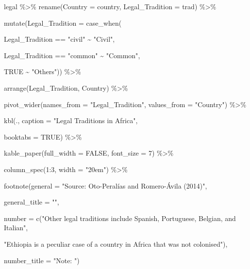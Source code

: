 \documentclass[a4paper,nobind]{templates/ociamthesis}
\newenvironment{Shaded}{\begin{snugshade}}{\end{snugshade}}
\newcommand{\AttributeTok}[1]{\textcolor[rgb]{0.77,0.63,0.00}{#1}}
\newcommand{\ConstantTok}[1]{\textcolor[rgb]{0.00,0.00,0.00}{#1}}
\newcommand{\DecValTok}[1]{\textcolor[rgb]{0.00,0.00,0.81}{#1}}
\newcommand{\FunctionTok}[1]{\textcolor[rgb]{0.00,0.00,0.00}{#1}}
\newcommand{\NormalTok}[1]{#1}
\newcommand{\SpecialCharTok}[1]{\textcolor[rgb]{0.00,0.00,0.00}{#1}}
\newcommand{\StringTok}[1]{\textcolor[rgb]{0.31,0.60,0.02}{#1}}
\renewenvironment{Shaded}
{
  \vspace{10pt}%
  \begin{snugshade}%
}{%
  \end{snugshade}%
  \vspace{8pt}%
}
\begin{document}
\begin{Shaded}
\begin{Highlighting}[]
\NormalTok{legal }\SpecialCharTok{\%\textgreater{}\%} \FunctionTok{rename}\NormalTok{(}\AttributeTok{Country =}\NormalTok{ country, }\AttributeTok{Legal\_Tradition =}\NormalTok{ trad) }\SpecialCharTok{\%\textgreater{}\%} 
  
  \FunctionTok{mutate}\NormalTok{(}\AttributeTok{Legal\_Tradition =} \FunctionTok{case\_when}\NormalTok{(}
    
\NormalTok{    Legal\_Tradition }\SpecialCharTok{==} \StringTok{"civil"} \SpecialCharTok{\textasciitilde{}} \StringTok{"Civil"}\NormalTok{,}
    
\NormalTok{    Legal\_Tradition }\SpecialCharTok{==} \StringTok{"common"} \SpecialCharTok{\textasciitilde{}} \StringTok{"Common"}\NormalTok{,}
    
    \ConstantTok{TRUE} \SpecialCharTok{\textasciitilde{}} \StringTok{"Others"}\NormalTok{)) }\SpecialCharTok{\%\textgreater{}\%} 
  
  \FunctionTok{arrange}\NormalTok{(Legal\_Tradition, Country) }\SpecialCharTok{\%\textgreater{}\%} 
  
  \FunctionTok{pivot\_wider}\NormalTok{(}\AttributeTok{names\_from =} \StringTok{"Legal\_Tradition"}\NormalTok{, }\AttributeTok{values\_from =} \StringTok{"Country"}\NormalTok{) }\SpecialCharTok{\%\textgreater{}\%} 
  
  \FunctionTok{kbl}\NormalTok{(., }\AttributeTok{caption =} \StringTok{"Legal Traditions in Africa"}\NormalTok{, }
      
      \AttributeTok{booktabs =} \ConstantTok{TRUE}\NormalTok{) }\SpecialCharTok{\%\textgreater{}\%} 
  
  \FunctionTok{kable\_paper}\NormalTok{(}\AttributeTok{full\_width =} \ConstantTok{FALSE}\NormalTok{, }\AttributeTok{font\_size =} \DecValTok{7}\NormalTok{) }\SpecialCharTok{\%\textgreater{}\%} 
  
  \FunctionTok{column\_spec}\NormalTok{(}\DecValTok{1}\SpecialCharTok{:}\DecValTok{3}\NormalTok{, }\AttributeTok{width =} \StringTok{"20em"}\NormalTok{) }\SpecialCharTok{\%\textgreater{}\%} 
  
  \FunctionTok{footnote}\NormalTok{(}\AttributeTok{general =} \StringTok{"Source: Oto{-}Peralías and Romero{-}Ávila (2014)"}\NormalTok{,}
           
           \AttributeTok{general\_title =} \StringTok{""}\NormalTok{,}
           
           \AttributeTok{number =} \FunctionTok{c}\NormalTok{(}\StringTok{"Other legal traditions include Spanish, Portuguese, Belgian, and Italian"}\NormalTok{, }
                      
                      \StringTok{"Ethiopia is a peculiar case of a country in Africa that was not colonised"}\NormalTok{),}
           
           \AttributeTok{number\_title =} \StringTok{"Note: "}\NormalTok{)}
\end{Highlighting}
\end{Shaded}
\end{document}

